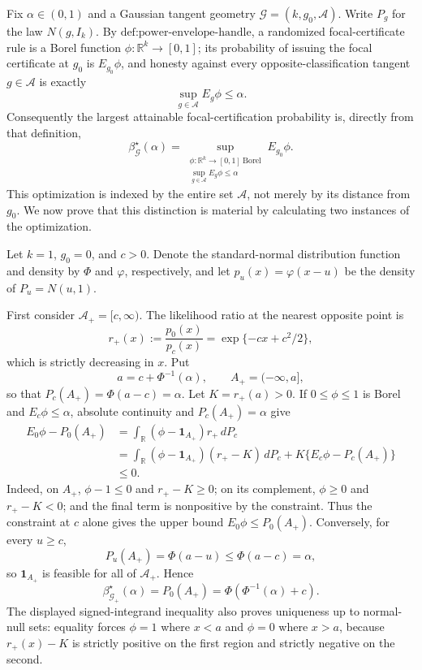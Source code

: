 Fix \(\alpha\in(0,1)\) and a Gaussian tangent geometry \(\mathcal G=(k,g_0,\mathcal A)\).  Write \(P_g\) for the law \(N(g,I_k)\).  By \(\text{def:power-envelope-handle}\), a randomized focal-certificate rule is a Borel function \(\phi:\mathbb R^k\to[0,1]\); its probability of issuing the focal certificate at \(g_0\) is \(E_{g_0}\phi\), and honesty against every opposite-classification tangent \(g\in\mathcal A\) is exactly
\[
 \sup_{g\in\mathcal A}E_g\phi\leq\alpha.
\]
Consequently the largest attainable focal-certification probability is, directly from that definition,
\[
 \beta^{\star}_{\mathcal G}(\alpha)
 =\sup_{\substack{\phi:\mathbb R^k\to[0,1]\ \mathrm{Borel}\\
                    \sup_{g\in\mathcal A}E_g\phi\leq\alpha}}
   E_{g_0}\phi.
\]
This optimization is indexed by the entire set \(\mathcal A\), not merely by its distance from \(g_0\).  We now prove that this distinction is material by calculating two instances of the optimization.

Let \(k=1\), \(g_0=0\), and \(c>0\).  Denote the standard-normal distribution function and density by \(\Phi\) and \(\varphi\), respectively, and let \(p_u(x)=\varphi(x-u)\) be the density of \(P_u=N(u,1)\).

First consider \(\mathcal A_+=[c,\infty)\).  The likelihood ratio at the nearest opposite point is
\[
 r_+(x):=\frac{p_0(x)}{p_c(x)}
 =\exp\{-cx+c^2/2\},
\]
which is strictly decreasing in \(x\).  Put
\[
 a=c+\Phi^{-1}(\alpha),\qquad A_+=(-\infty,a],
\]
so that \(P_c(A_+)=\Phi(a-c)=\alpha\).  Let \(K=r_+(a)>0\).  If \(0\leq\phi\leq1\) is Borel and \(E_c\phi\leq\alpha\), absolute continuity and \(P_c(A_+)=\alpha\) give
\[
 \begin{aligned}
 E_0\phi-P_0(A_+)
 &=\int_{\mathbb R}(\phi-\mathbf 1_{A_+})r_+\,dP_c\\
 &=\int_{\mathbb R}(\phi-\mathbf 1_{A_+})(r_+-K)\,dP_c
   +K\{E_c\phi-P_c(A_+)\}\\
 &\leq0.
 \end{aligned}
\]
Indeed, on \(A_+\), \(\phi-1\leq0\) and \(r_+-K\geq0\); on its complement, \(\phi\geq0\) and \(r_+-K<0\); and the final term is nonpositive by the constraint.  Thus the constraint at \(c\) alone gives the upper bound \(E_0\phi\leq P_0(A_+)\).  Conversely, for every \(u\geq c\),
\[
 P_u(A_+)=\Phi(a-u)\leq\Phi(a-c)=\alpha,
\]
so \(\mathbf 1_{A_+}\) is feasible for all of \(\mathcal A_+\).  Hence
\[
 \beta^{\star}_{\mathcal G_+}(\alpha)
 =P_0(A_+)
 =\Phi\!\left(\Phi^{-1}(\alpha)+c\right).
\]
The displayed signed-integrand inequality also proves uniqueness up to normal-null sets: equality forces \(\phi=1\) where \(x<a\) and \(\phi=0\) where \(x>a\), because \(r_+(x)-K\) is strictly positive on the first region and strictly negative on the second.

